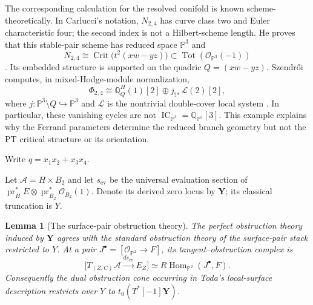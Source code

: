 \documentclass[11pt,reqno]{amsart}
\newtheorem{lemma}[theorem]{Lemma}
\theoremstyle{definition}
\newcommand{\Q}{\mathbb Q}
\newcommand{\Pp}{\mathbb P}
\newcommand{\Ocal}{\mathcal O}
\newcommand{\IC}{\operatorname{IC}}
\newcommand{\Tot}{\operatorname{Tot}}
\begin{document}
The corresponding calculation for the resolved conifold is known
scheme-theoretically.  In Carlucci's notation, $N_{2,4}$ has curve class two
and Euler characteristic four; the second index is not a Hilbert-scheme
length.  He proves that this stable-pair scheme has reduced space $\Pp^3$ and
\[
 N_{2,4}\cong
 \operatorname{Crit}\bigl(t^2(xw-yz)\bigr)
 \subset\Tot(\Ocal_{\Pp^3}(-1))
\]
\cite[Theorem~4.3.6]{Carlucci}.  Its embedded structure is supported on the
quadric $Q=(xw-yz)$.  Szendr\H{o}i computes, in mixed-Hodge-module
normalization,
\[
 \Phi_{2,4}\cong
 \Q_Q^H(1)[2]\oplus j_{!*}\mathcal L(2)[2],
\]
where $j:\Pp^3\setminus Q\hookrightarrow\Pp^3$ and $\mathcal L$ is the
nontrivial double-cover local system \cite[Example~4.5 and
Proposition~B.1]{Szendroi}.  In particular, these vanishing cycles are not
$\IC_{\Pp^3}=\Q_{\Pp^3}[3]$.  This example explains why the Ferrand
parameters determine the reduced branch geometry but not the PT critical structure
or its orientation.

Write $q=x_1x_2+x_3x_4$.

Let $\mathcal A=H\times B_2$ and let $s_{\mathrm{ev}}$ be the universal
evaluation section of
$\operatorname{pr}_H^*E\otimes\operatorname{pr}_{B_2}^*\Ocal_{B_2}(1)$.
Denote its derived zero locus by $\mathbf Y$; its classical truncation is
$Y$.

\begin{lemma}[The surface-pair obstruction theory]
\label{lem:derived-incidence-chart}
The perfect obstruction theory induced by $\mathbf Y$ agrees with the
standard obstruction theory of the surface-pair stack restricted to $Y$.
At a pair $J^\bullet=[\Ocal_{\Pp^2}\to F]$, its tangent--obstruction complex
is
\[
 \bigl[T_{(Z,C)}\mathcal A\xrightarrow{d s_{\mathrm{ev}}}E_Z\bigr]
 \simeq R\!\operatorname{Hom}_{\Pp^2}(J^\bullet,F).
\]
Consequently the dual obstruction cone occurring in Toda's local-surface
description restricts over $Y$ to
$t_0(T^*[-1]\mathbf Y)$.
\end{lemma}
\end{document}
